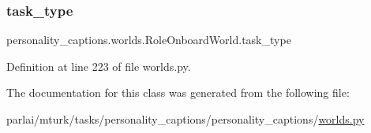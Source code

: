 \subsubsection{\texorpdfstring{task\+\_\+type}{task\_type}}
{\footnotesize\ttfamily personality\+\_\+captions.\+worlds.\+Role\+Onboard\+World.\+task\+\_\+type}



Definition at line 223 of file worlds.\+py.



The documentation for this class was generated from the following file\+:\begin{DoxyCompactItemize}
\item 
parlai/mturk/tasks/personality\+\_\+captions/personality\+\_\+captions/\hyperlink{parlai_2mturk_2tasks_2personality__captions_2personality__captions_2worlds_8py}{worlds.\+py}\end{DoxyCompactItemize}
